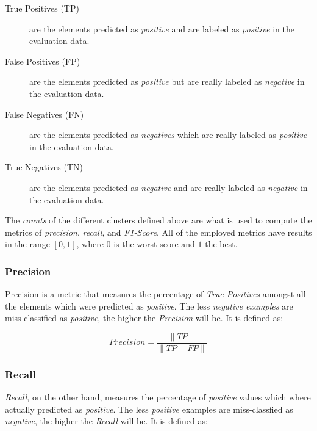 \documentclass[epsfig,a4paper,11pt,titlepage,twoside,openany]{book}
\begin{document}
\begin{description}
\item[True Positives (TP)] are the elements predicted as \textit{positive}
  and are labeled as \textit{positive} in the evaluation data.
 
\item[False Positives (FP)] are the elements predicted as \textit{positive}
  but are really labeled as \textit{negative} in the evaluation data.
 
\item[False Negatives (FN)] are the elements predicted as \textit{negatives}
  which are really labeled as \textit{positive} in the evaluation data.
 
\item[True Negatives (TN)] are the elements predicted as \textit{negative}
  and are really labeled as \textit{negative} in the evaluation data.
\end{description}


The \textit{counts} of the different clusters defined above are what is used to compute the metrics of \textit{precision}, \textit{recall}, and \textit{F1-Score}. All of the employed metrics have results in the range $[0,1]$, where $0$ is the worst score and $1$ the best.


\subsubsection{Precision}
\label{sec:evaluation-metric-precision}

Precision is a metric that measures the percentage of \textit{True Positives}
amongst all the elements which were predicted as \textit{positive}. The less \textit{negative examples} are miss-classified as \textit{positive}, the higher the
\textit{Precision} will be. It is defined as:

$$
Precision = \frac{\|TP\|}{\|TP + FP\|}
$$
  


\subsubsection{Recall}
\label{sec:evaluation-metric-recall}

\textit{Recall}, on the other hand, measures the percentage of \textit{positive} values which where actually predicted as \textit{positive}. The less \textit{positive} examples are miss-classfied as \textit{negative}, the higher the
\textit{Recall} will be. It is defined as:
\end{document}
